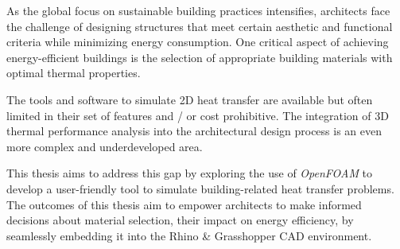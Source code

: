 
\begin{summary}

As the global focus on sustainable building practices intensifies, architects face the challenge of designing structures that meet certain aesthetic and functional criteria while minimizing energy consumption. 
One critical aspect of achieving energy-efficient buildings is the selection of appropriate building materials with optimal thermal properties. 






The tools and software to simulate 2D heat transfer are available but often limited in their set of features and / or cost prohibitive. 
The integration of 3D thermal performance analysis into the architectural design process is an even more complex and underdeveloped area. 


This thesis aims to address this gap by exploring the use of \textit{OpenFOAM} to develop a user-friendly tool to simulate building-related heat transfer problems.
The outcomes of this thesis aim to empower architects to make informed decisions about material selection, their impact on energy efficiency, by seamlessly embedding it into the Rhino \& Grasshopper CAD environment.

\end{summary} 